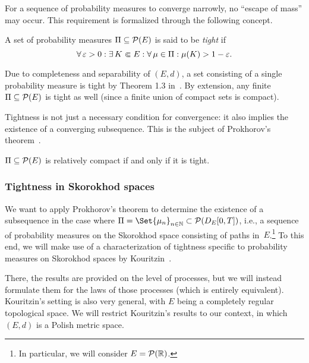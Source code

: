 For a sequence of probability measures to converge narrowly, no \enquote{escape of mass} may occur.
This requirement is formalized through the following concept.

\begin{definition}
  A set of probability measures \(\Pi \subseteq \mathcal{P}(E)\) is said to be \textit{tight} if
  \begin{equation}
    \forall \eps > 0 : \exists K \Subset E : \forall \mu \in \Pi : \mu(K) > 1 - \eps.
  \end{equation}
\end{definition}

Due to completeness and separability of \((E,d)\), a set consisting of a single probability measure is tight by Theorem 1.3 in~\cite{billingsleyConvergenceProbabilityMeasures1999}.
By extension, any finite \(\Pi \subseteq \mathcal{P}(E)\) is tight as well (since a finite union of compact sets is compact).

Tightness is not just a necessary condition for convergence: it also implies the existence of a converging subsequence.
This is the subject of Prokhorov's theorem~\cite[57-65]{billingsleyConvergenceProbabilityMeasures1999}.

\begin{theorem}[Prokhorov]
  \( \Pi \subseteq \mathcal{P}(E) \) is relatively compact if and only if it is tight.
\end{theorem}

\subsubsection{Tightness in Skorokhod spaces}

We want to apply Prokhorov's theorem to determine the existence of a subsequence in the case where \( \Pi = \Set{\mu_n}_{n\in\bN} \subset \cP(D_{E}[0,T]) \), i.e., a sequence of probability measures on the Skorokhod space consisting of paths in~\(E\).\footnote{In particular, we will consider \(E = \mathcal{P}(\mathbb{R})\).}
To this end, we will make use of a characterization of tightness specific to probability measures on Skorokhod spaces by Kouritzin~\cite{kouritzinTightnessProbabilityMeasures2015}.

There, the results are provided on the level of processes, but we will instead formulate them for the laws of those processes (which is entirely equivalent).
Kouritzin's setting is also very general, with \( E \) being a completely regular topological space.
We will restrict Kouritzin's results to our context, in which \((E,d)\) is a Polish metric space.

